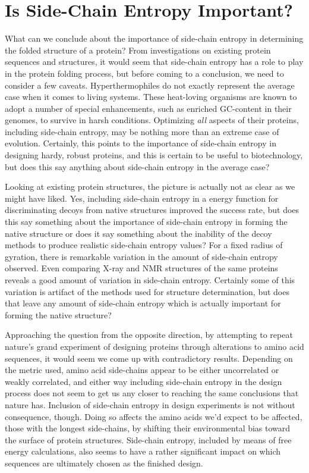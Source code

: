 \section*{Is Side-Chain Entropy Important?}
\label{sec:is_side_chain_entropy_important_}
What can we conclude about the importance of side-chain entropy in determining the folded structure of a protein? From investigations on existing protein sequences and structures, it would seem that side-chain entropy has a role to play in the protein folding process, but before coming to a conclusion, we need to consider a few caveats. Hyperthermophiles do not exactly represent the average case when it comes to living systems. These heat-loving organisms are known to adopt a number of special enhancements, such as enriched GC-content in their genomes, to survive in harsh conditions. Optimizing \emph{all} aspects of their proteins, including side-chain entropy, may be nothing more than an extreme case of evolution. Certainly, this points to the importance of side-chain entropy in designing hardy, robust proteins, and this is certain to be useful to biotechnology, but does this say anything about side-chain entropy in the average case?

Looking at existing protein structures, the picture is actually not as clear as we might have liked. Yes, including side-chain entropy in a energy function for discriminating decoys from native structures improved the success rate, but does this say something about the importance of side-chain entropy in forming the native structure or does it say something about the inability of the decoy methods to produce realistic side-chain entropy values? For a fixed radius of gyration, there is remarkable variation in the amount of side-chain entropy observed. Even comparing X-ray and NMR structures of the same proteins reveals a good amount of variation in side-chain entropy. Certainly some of this variation is artifact of the methods used for structure determination, but does that leave any amount of side-chain entropy which is actually important for forming the native structure?

Approaching the question from the opposite direction, by attempting to repeat nature's grand experiment of designing proteins through alterations to amino acid sequences, it would seem we come up with contradictory results. Depending on the metric used, amino acid side-chains appear to be either uncorrelated or weakly correlated, and either way including side-chain entropy in the design process does not seem to get us any closer to reaching the same conclusions that nature has. Inclusion of side-chain entropy in design experiments is not without consequence, though. Doing so affects the amino acids we'd expect to be affected, those with the longest side-chains, by shifting their environmental bias toward the surface of protein structures. Side-chain entropy, included by means of free energy calculations, also seems to have a rather significant impact on which sequences are ultimately chosen as the finished design.

